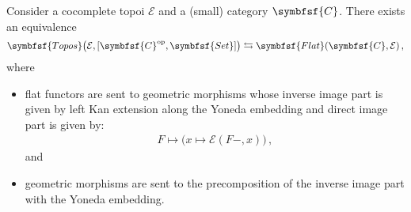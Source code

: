     \begin{theorem}
        Consider a cocomplete topoi $\mathcal{E}$ and a (small) category $\symbfsf{C}$. There exists an equivalence
        \begin{gather}
            \symbfsf{Topos}\bigl(\mathcal{E},[\symbfsf{C}^{\mathrm{op}},\symbfsf{Set}]\bigr)\leftrightarrows\symbfsf{Flat}(\symbfsf{C},\mathcal{E})\,,
        \end{gather}
        where
        \begin{itemize}
            \item flat functors are sent to geometric morphisms whose inverse image part is given by left Kan extension along the Yoneda embedding and direct image part is given by:
            \begin{gather}
                F\mapsto\bigl(x\mapsto\mathcal{E}(F-, x)\bigr)\,,
            \end{gather}
            and
            \item geometric morphisms are sent to the precomposition of the inverse image part with the Yoneda embedding.
        \end{itemize}
    \end{theorem}

